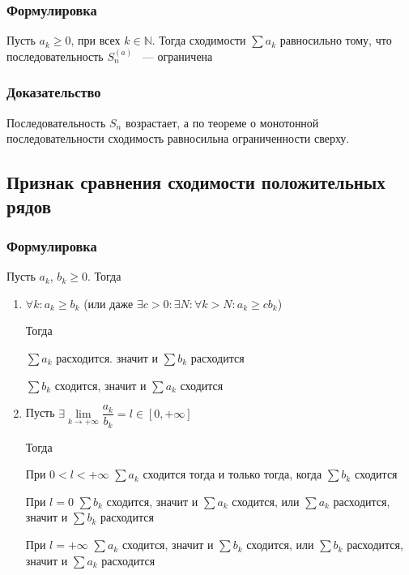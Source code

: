 \documentclass{article}
\begin{document}
            \subsubsection{Формулировка}
            
                Пусть $a_k \geq 0$, при всех $k \in \mathbb{N}$. Тогда сходимости $\sum a_k$ равносильно тому, что последовательность $S_n^{(a)}$ ~--- ограничена
                
            \subsubsection{Доказательство}
            
                Последовательность ${S_n}$ возрастает, а по теореме о монотонной последовательности сходимость равносильна ограниченности сверху.
                
        \subsection{Признак сравнения сходимости положительных рядов}
        
            \subsubsection{Формулировка}
            
                Пусть $a_k$, $b_k \geq 0$. Тогда
                
                \begin{enumerate}
                
                    \item $\forall k : a_k \geq b_k$ (или даже $\exists c > 0 : \exists N : \forall k > N : a_k \geq c b_k$)
                    
                        Тогда
                        
                            $\sum a_k$ расходится. значит и $\sum b_k$ расходится
                            
                            $\sum b_k$ сходится, значит и $\sum a_k$ сходится
                            
                    \item Пусть $\exists \lim\limits_{k \rightarrow +\infty} \dfrac{a_k}{b_k} = l \in [0, +\infty]$
                    
                        Тогда
                        
                            При $0 < l < +\infty$ $\sum a_k$ сходится тогда и только тогда, когда $\sum b_k$ сходится
                            
                            При $l = 0$ $\sum b_k$ сходится, значит и $\sum a_k$ сходится, или $\sum a_k$ расходится, значит и $\sum b_k$ расходится
                            
                            При $l = +\infty$ $\sum a_k$ сходится, значит и $\sum b_k$ сходится, или $\sum b_k$ расходится, значит и $\sum a_k$ расходится
                            
                \end{enumerate}
                
\end{document}
